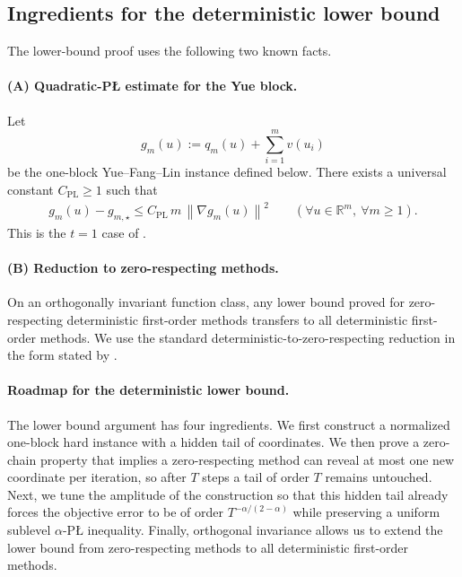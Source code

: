 \documentclass[11pt]{article}
\newcommand{\R}{\mathbb{R}}
\newcommand{\norm}[1]{\left\lVert #1\right\rVert}
\begin{document}
\subsection{Ingredients for the deterministic lower bound}
\label{app:det-ingredients}
The lower-bound proof uses the following two known facts.

\paragraph{(A) Quadratic-P\L{} estimate for the Yue block.}
Let
\[
g_m(u):=q_m(u)+\sum_{i=1}^m v(u_i)
\]
be the one-block Yue--Fang--Lin instance defined below.
There exists a universal constant $C_{\mathrm{PL}}\ge 1$ such that
\begin{align}\label{eq_PL2_YFL}
    g_m(u)-g_{m,\star}
\le
C_{\mathrm{PL}}\,m\,\norm{\nabla g_m(u)}^2
\qquad (\forall u\in\R^m,\ \forall m\ge 1).
\end{align}
This is the $t=1$ case of \citet[Lemma~2]{YueFangLin2023}.

\paragraph{(B) Reduction to zero-respecting methods.}
On an orthogonally invariant function class, any lower bound proved for zero-respecting deterministic first-order methods transfers to all deterministic first-order methods.
We use the standard deterministic-to-zero-respecting reduction in the form stated by
\citet[Proposition~1 and the surrounding discussion]{CarmonDuchiHinderSidford2021}.

\paragraph{Roadmap for the deterministic lower bound.}
The lower bound argument has four ingredients. We first construct a normalized one-block hard instance with a hidden tail of
coordinates. We then prove a zero-chain property that implies a zero-respecting method can reveal at most one new coordinate
per iteration, so after $T$ steps a tail of order $T$ remains untouched. Next, we tune the amplitude of the construction so that
this hidden tail already forces the objective error to be of order \(T^{-\alpha/(2-\alpha)}\) while preserving a uniform sublevel
$\alpha$-P\L{} inequality. Finally, orthogonal invariance allows us to extend the lower bound from zero-respecting methods to all
deterministic first-order methods.
\end{document}
